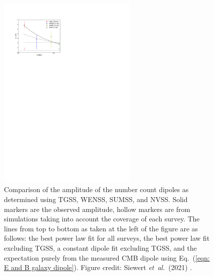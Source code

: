 \documentclass[a4paper,12pt]{report}
\newcommand{\etal}{\emph{et~al.\ }}
\renewcommand{\eqref}[1]{Eq.~({#1})}
\begin{document}
\begin{figure}[t]
  \centering
  \includegraphics[width=0.6\textwidth]{Siewert 2021 Dipole Frequency Dependence.pdf}
  \caption{Comparison of the amplitude of the number count dipoles as determined using TGSS, WENSS, SUMSS, and NVSS. Solid markers are the observed amplitude, hollow markers are from simulations taking into account the coverage of each survey. The lines from top to bottom as taken at the left of the figure are as follows: the best power law fit for all surveys, the best power law fit excluding TGSS, a constant dipole fit excluding TGSS, and the expectation purely from the measured CMB dipole using \eqref{\ref{eqn: E and B galaxy dipole}}. Figure credit: Siewert \etal (2021) \cite{RN86}.}
  \label{fig: Cosmic Radio Dipole Frequency Dependence from Siewert et al}
\end{figure}
\end{document}
